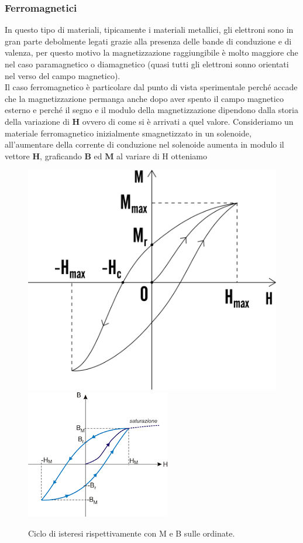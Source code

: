 \documentclass[
10pt, %
a4paper, %
oneside, %
headinclude,footinclude, %
BCOR5mm, %
]{scrartcl}
\begin{document}
\subsubsection{Ferromagnetici}
In questo tipo di materiali, tipicamente i materiali metallici, gli elettroni sono in gran parte debolmente legati grazie alla presenza delle bande di conduzione e di valenza, per questo motivo la magnetizzazione raggiungibile è molto maggiore che nel caso paramagnetico o diamagnetico (quasi tutti gli elettroni sonno orientati nel verso del campo magnetico).\\  
Il caso ferromagnetico è particolare dal punto di vista sperimentale perché accade che la magnetizzazione permanga anche dopo aver spento il campo magnetico esterno e perché il segno e il modulo della magnetizzazione dipendono dalla storia della variazione di \(\mathbf{H}\) ovvero di come si è arrivati a quel valore. Consideriamo un materiale ferromagnetico inizialmente smagnetizzato in un solenoide, all'aumentare della corrente di conduzione nel solenoide aumenta in modulo il vettore \(\mathbf{H}\), graficando \(\mathbf{B}\) ed \(\mathbf{M}\) al variare di H otteniamo 
\begin{figure}[h!]
	\centering
	\includegraphics[width=0.6\linewidth]{images/isteresi_M}
	\quad
	\includegraphics[width=0.6\linewidth]{images/isteresi_B}
	\caption{Ciclo di isteresi rispettivamente con M e B sulle ordinate.}
	\label{fig:isteresim}
\end{figure}
\end{document}
